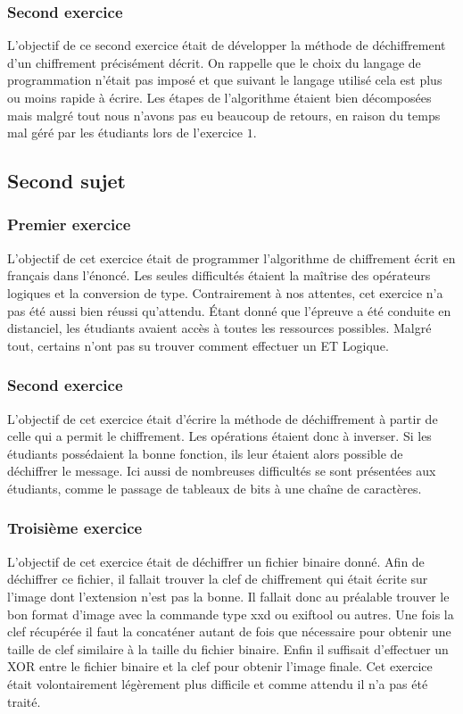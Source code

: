 \documentclass[12pt]{article}
\begin{document}
\subsubsection{Second exercice}

L'objectif de ce second exercice était de développer la méthode de déchiffrement d'un chiffrement précisément décrit. On rappelle que le choix du langage de programmation n'était pas imposé et que suivant le langage utilisé cela est plus ou moins rapide à écrire. Les étapes de l'algorithme étaient bien décomposées mais malgré tout nous n'avons pas eu beaucoup de retours, en raison du temps mal géré par les étudiants lors de l'exercice $1$.

\pagebreak

\subsection{Second sujet}
\subsubsection{Premier exercice}
L'objectif de cet exercice était de programmer l'algorithme de chiffrement écrit en français dans l'énoncé. Les seules difficultés étaient la maîtrise des opérateurs logiques et la conversion de type. Contrairement à nos attentes, cet exercice n'a pas été aussi bien réussi qu'attendu. Étant donné que l'épreuve a été conduite en distanciel, les étudiants avaient accès à toutes les ressources possibles. Malgré tout, certains n'ont pas su trouver comment effectuer un \textsf{ET Logique}.

\subsubsection{Second exercice}
L'objectif de cet exercice était d'écrire la méthode de déchiffrement à partir de celle qui a permit le chiffrement. Les opérations étaient donc à inverser. Si les étudiants possédaient la bonne fonction, ils leur étaient alors possible de déchiffrer le message. Ici aussi de nombreuses difficultés se sont présentées aux étudiants, comme le passage de tableaux de bits à une chaîne de caractères.

\subsubsection{Troisième exercice}
L'objectif de cet exercice était de déchiffrer un fichier binaire donné. Afin de déchiffrer ce fichier, il fallait trouver la clef de chiffrement qui était écrite sur l'image dont l'extension n'est pas la bonne. Il fallait donc au préalable trouver le bon format d'image avec la commande type \textsf{xxd} ou \textsf{exiftool} ou autres. Une fois la clef récupérée il faut la concaténer autant de fois que nécessaire pour obtenir une taille de clef similaire à la taille du fichier binaire. Enfin il suffisait d'effectuer un \textsf{XOR} entre le fichier binaire et la clef pour obtenir l'image finale. Cet exercice était volontairement légèrement plus difficile et comme attendu il n'a pas été traité.
\end{document}
